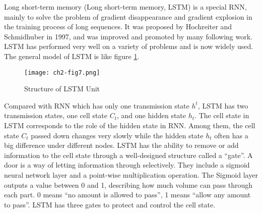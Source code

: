 Long short-term memory (Long short-term memory, LSTM) is a special RNN, mainly to solve the problem of gradient disappearance and gradient explosion in the training process of long sequences. It was proposed by Hochreiter and Schmidhuber in 1997\cite{lstm1997}, and was improved and promoted by many following work. LSTM has performed very well on a variety of problems and is now widely used. The general model of LSTM is like figure \ref{ch2-fig7}.

\begin{figure}[h]
	\centering
	\texttt{[image: ch2-fig7.png]}
	\caption{Structure of LSTM Unit}
	\label{ch2-fig7}
\end{figure}


Compared with RNN which has only one transmission state \(h^t\), LSTM has two transmission states, one cell state \(C_t\), and one hidden state \(h_t\). The cell state in LSTM corresponds to the role of the hidden state in RNN. Among them, the cell state \(C_t\) passed down changes very slowly while the hidden state \(h_t\) often has a big difference under different nodes. LSTM has the ability to remove or add information to the cell state through a well-designed structure called a ``gate''. A door is a way of letting information through selectively. They include a sigmoid neural network layer and a point-wise multiplication operation. The Sigmoid layer outputs a value between 0 and 1, describing how much volume can pass through each part. 0 means ``no amount is allowed to pass'', 1 means ``allow any amount to pass''. LSTM has three gates to protect and control the cell state.

